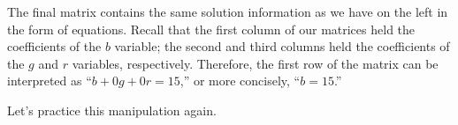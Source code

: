 The final matrix contains the same solution information as we have on the left in the form of equations. Recall that the first column of our matrices held the coefficients of the $b$ variable; the second and third columns held the coefficients of the $g$ and $r$ variables, respectively. Therefore, the first row of the matrix can be interpreted as ``$b+0g+0r=15$,'' or more concisely, ``$b=15$.''

Let's practice this manipulation again.

\medskip

